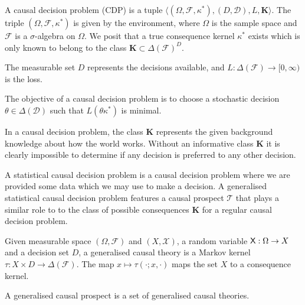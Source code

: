 \begin{definition}
A causal decision problem (CDP) is a tuple $\langle (\Omega,\mathcal{F},\kappa^*), (D,\mathcal{D}), L, \mathbf{K} \rangle$. The triple $(\Omega,\mathcal{F},\kappa^*)$ is given by the environment, where $\Omega$ is the sample space and $\mathcal{F}$ is a $\sigma$-algebra on $\Omega$. We posit that a true consequence kernel $\kappa^*$ exists which is only known to belong to the class $\mathbf{K}\subset \Delta(\mathcal{F})^D$.

The measurable set $D$ represents the decisions available, and $L:\Delta(\mathcal{F})\to [0,\infty)$ is the loss.

The objective of a causal decision problem is to choose a stochastic decision $\theta\in \Delta(\mathcal{D})$ such that $L(\theta \kappa^*)$ is minimal.
\end{definition}

In a causal decision problem, the class $\mathbf{K}$ represents the given background knowledge about how the world works. Without an informative class $\mathbf{K}$ it is clearly impossible to determine if any decision is preferred to any other decision.

A statistical causal decision problem is a causal decision problem where we are provided some data which we may use to make a decision. A generalised statistical causal decision problem features a causal prospect $\mathscr{T}$ that plays a similar role to to the class of possible consequences $\mathbf{K}$ for a regular causal decision problem.

\begin{definition}\label{def:gen_causal_theory}
Given measurable space $(\Omega,\mathcal{F})$ and $(X,\mathcal{X})$, a random variable $\mathsf{X}:\Omega\to X$ and a decision set $D$, a generalised causal theory is a Markov kernel $\tau:X\times D \to \Delta(\mathcal{F})$. The map $x\mapsto \tau(\cdot;x,\cdot)$ maps the set $X$ to a consequence kernel.
\end{definition}

\begin{definition}\label{def:gen_causal_prospect}
A generalised causal prospect is a set of generalised causal theories.
\end{definition}

